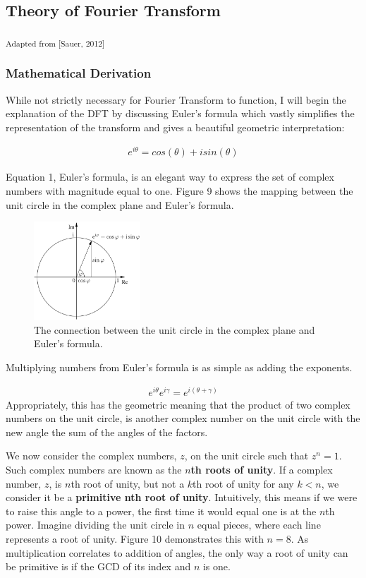 \documentclass[DIV=calc, paper=a4, fontsize=11pt, twocolumn]{scrartcl}   %
\begin{document}
\subsection{Theory of Fourier Transform}
\textsubscript{Adapted from [Sauer, 2012]}
\subsubsection{Mathematical Derivation}

While not strictly necessary for Fourier Transform to function, I will begin the explanation of the DFT by discussing Euler's formula which vastly simplifies the representation of the transform and gives a beautiful geometric interpretation:

\begin{align}
e^{i\theta} = cos(\theta) + isin(\theta)
\end{align}

Equation 1, Euler's formula, is an elegant way to express the set of complex numbers with magnitude equal to one. Figure 9 shows the mapping between the unit circle in the complex plane and Euler's formula.

\begin{figure}[h]
\centering
\includegraphics[width=40mm]{figures/EulersFormula.png}
\caption{The connection between the unit circle in the complex plane and Euler's formula. }
\label{overflow}
\end{figure}


Multiplying numbers from Euler's formula is as simple as adding the exponents.

\begin{align}
e^{i\theta}e^{i\gamma} = e^{i(\theta+\gamma)}
\end{align}
Appropriately, this has the geometric meaning that the product of two complex numbers on the unit circle, is another complex number on the unit circle with the new angle the sum of the angles of the factors.
\par We now consider the complex numbers, $z$, on the unit circle such that $z^n = 1 $. Such complex numbers are known as the \textbf{$n$th roots of unity}. If a complex number, $z$, is $n$th root of unity, but not a $k$th root of unity for any $k<n$, we consider it be a \textbf{primitive nth root of unity}. Intuitively, this means if we were to raise this angle to a power, the first time it would equal one is at the $n$th power. Imagine dividing the unit circle in $n$ equal pieces, where each line represents a root of unity. Figure 10 demonstrates this with $n=8$. As multiplication correlates to addition of angles, the only way a root of unity can be primitive is if the GCD of its index and $n$ is one.
\end{document}
